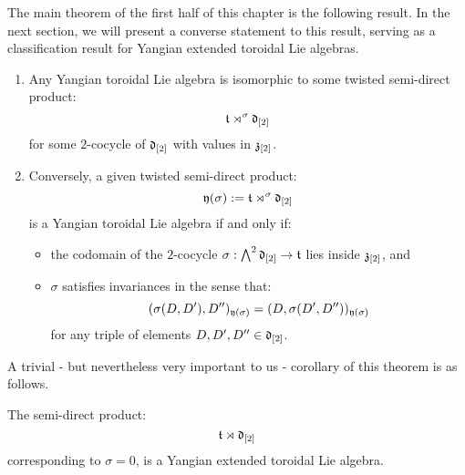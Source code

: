        The main theorem of the first half of this chapter is the following result. In the next section, we will present a converse statement to this result, serving as a classification result for Yangian extended toroidal Lie algebras.
        \begin{theorem} \label{theorem: yangian_extended_toroidal_lie_algebras_preliminary_version}
            \begin{enumerate}
                \item Any Yangian toroidal Lie algebra is isomorphic to some twisted semi-direct product:
                    $$\mathfrak{t} \rtimes^{\sigma} \mathfrak{d}_{[2]}$$
                for some $2$-cocycle of $\mathfrak{d}_{[2]}$ with values in $\mathfrak{z}_{[2]}$.
                \item Conversely, a given twisted semi-direct product:
                    $$\mathfrak{y}(\sigma) := \mathfrak{t} \rtimes^{\sigma} \mathfrak{d}_{[2]}$$
                is a Yangian toroidal Lie algebra if and only if:
                \begin{itemize}
                    \item the codomain of the $2$-cocycle $\sigma: \bigwedge^2 \mathfrak{d}_{[2]} \to \mathfrak{t}$ lies inside $\mathfrak{z}_{[2]}$, and 
                    \item $\sigma$ satisfies invariances in the sense that:
                        $$(\sigma(D, D'), D'')_{\mathfrak{y}(\sigma)} = (D, \sigma(D', D''))_{\mathfrak{y}(\sigma)}$$
                    for any triple of elements $D, D', D'' \in \mathfrak{d}_{[2]}$.
                \end{itemize}
            \end{enumerate}
        \end{theorem}
        A trivial - but nevertheless very important to us - corollary of this theorem is as follows.
        \begin{corollary}
            The semi-direct product:
                $$\mathfrak{t} \rtimes \mathfrak{d}_{[2]}$$
            corresponding to $\sigma = 0$, is a Yangian extended toroidal Lie algebra.
        \end{corollary}

